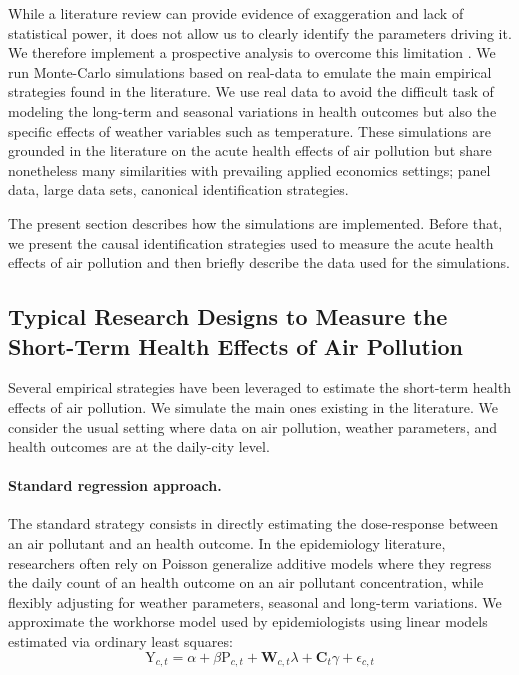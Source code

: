 \documentclass[12pt]{article}
\begin{document}
    While a literature review can provide evidence of exaggeration and lack of statistical power, it does not allow us to clearly identify the parameters driving it. We therefore implement a prospective analysis to overcome this limitation \citep[for other examples of power simulations]{altoe_enhancing_2020, black_simulated_2022}. We run Monte-Carlo simulations based on real-data to emulate the main empirical strategies found in the literature. We use real data to avoid the difficult task of modeling the long-term and seasonal variations in health outcomes but also the specific effects of weather variables such as temperature. These simulations are grounded in the literature on the acute health effects of air pollution but share nonetheless many similarities with prevailing applied economics settings; panel data, large data sets, canonical identification strategies.
    
    The present section describes how the simulations are implemented. Before that, we present the causal identification strategies used to measure the acute health effects of air pollution and then briefly describe the data used for the simulations.
        
    \subsection{Typical Research Designs to Measure the Short-Term Health Effects of Air Pollution}
        
        Several empirical strategies have been leveraged to estimate the short-term health effects of air pollution. We simulate the main ones existing in the literature. We consider the usual setting where data on air pollution, weather parameters, and health outcomes are at the daily-city level.
        
        \begin{sloppypar}
        \paragraph{Standard regression approach.} The standard strategy consists in directly estimating the dose-response between an air pollutant and an health outcome. In the epidemiology literature, researchers often rely on Poisson generalize additive models where they regress the daily count of an health outcome on an air pollutant concentration, while flexibly adjusting for weather parameters, seasonal and long-term variations. We approximate the workhorse model used by epidemiologists using linear models estimated via ordinary least squares:
        ~
        \begin{equation}
            \text{Y}_{c,t} = \alpha + \beta\text{P}_{c,t} + \textbf{W}_{c,t}\lambda + \textbf{C}_{t}\gamma + \epsilon_{c,t}
        \end{equation}
        \end{sloppypar}
        
\end{document}
